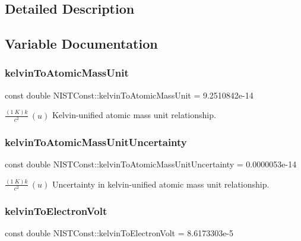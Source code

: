 \subsection{Detailed Description}


\subsection{Variable Documentation}
\mbox{\label{group___kelvin_gadad57a8f65f4d323846c97fbe0c485b1}} 
\subsubsection{\texorpdfstring{kelvin\+To\+Atomic\+Mass\+Unit}{kelvinToAtomicMassUnit}}
{\footnotesize\ttfamily const double N\+I\+S\+T\+Const\+::kelvin\+To\+Atomic\+Mass\+Unit = 9.\+2510842e-\/14}

$\frac{(1\ K)k}{c^2} \ (u)$ Kelvin-\/unified atomic mass unit relationship. \mbox{\label{group___kelvin_ga9a73cc5e600276756aa8054000db2a12}} 
\subsubsection{\texorpdfstring{kelvin\+To\+Atomic\+Mass\+Unit\+Uncertainty}{kelvinToAtomicMassUnitUncertainty}}
{\footnotesize\ttfamily const double N\+I\+S\+T\+Const\+::kelvin\+To\+Atomic\+Mass\+Unit\+Uncertainty = 0.\+0000053e-\/14}

$\frac{(1\ K)k}{c^2} \ (u)$ Uncertainty in kelvin-\/unified atomic mass unit relationship. \mbox{\label{group___kelvin_gae61d97fa154d94e710c951a26bd47896}} 
\subsubsection{\texorpdfstring{kelvin\+To\+Electron\+Volt}{kelvinToElectronVolt}}
{\footnotesize\ttfamily const double N\+I\+S\+T\+Const\+::kelvin\+To\+Electron\+Volt = 8.\+6173303e-\/5}

